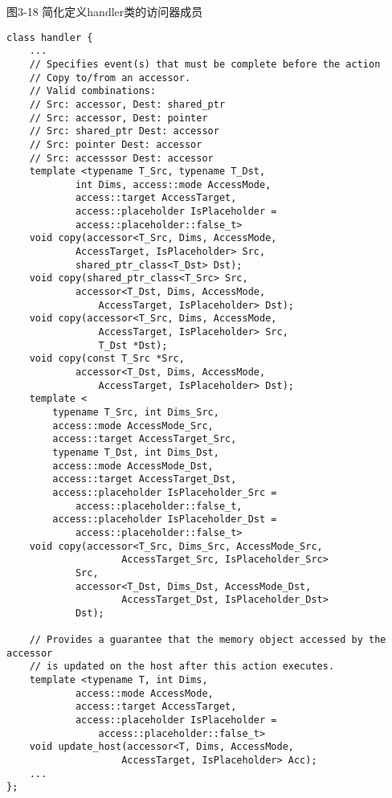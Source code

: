 \hspace*{\fill} \par %
图3-18 简化定义handler类的访问器成员
\begin{lstlisting}[caption={}]
class handler {
	...
	// Specifies event(s) that must be complete before the action
	// Copy to/from an accessor.
	// Valid combinations:
	// Src: accessor, Dest: shared_ptr
	// Src: accessor, Dest: pointer
	// Src: shared_ptr Dest: accessor
	// Src: pointer Dest: accessor
	// Src: accesssor Dest: accessor
	template <typename T_Src, typename T_Dst, 
			int Dims, access::mode AccessMode,
			access::target AccessTarget,
			access::placeholder IsPlaceholder = 
			access::placeholder::false_t>
	void copy(accessor<T_Src, Dims, AccessMode, 
			AccessTarget, IsPlaceholder> Src,
			shared_ptr_class<T_Dst> Dst);
	void copy(shared_ptr_class<T_Src> Src,
			accessor<T_Dst, Dims, AccessMode, 
				AccessTarget, IsPlaceholder> Dst);
	void copy(accessor<T_Src, Dims, AccessMode, 
				AccessTarget, IsPlaceholder> Src,
				T_Dst *Dst);
	void copy(const T_Src *Src,
			accessor<T_Dst, Dims, AccessMode, 
				AccessTarget, IsPlaceholder> Dst);
	template <
		typename T_Src, int Dims_Src, 
		access::mode AccessMode_Src,
		access::target AccessTarget_Src, 
		typename T_Dst, int Dims_Dst,
		access::mode AccessMode_Dst, 
		access::target AccessTarget_Dst,
		access::placeholder IsPlaceholder_Src = 
			access::placeholder::false_t,
		access::placeholder IsPlaceholder_Dst = 
			access::placeholder::false_t>
	void copy(accessor<T_Src, Dims_Src, AccessMode_Src, 
					AccessTarget_Src, IsPlaceholder_Src>
			Src,
			accessor<T_Dst, Dims_Dst, AccessMode_Dst, 
					AccessTarget_Dst, IsPlaceholder_Dst>
			Dst);
			
	// Provides a guarantee that the memory object accessed by the accessor
	// is updated on the host after this action executes.
	template <typename T, int Dims, 
			access::mode AccessMode,
			access::target AccessTarget,
			access::placeholder IsPlaceholder =
				access::placeholder::false_t>
	void update_host(accessor<T, Dims, AccessMode, 
					AccessTarget, IsPlaceholder> Acc);
	...
};
\end{lstlisting}













